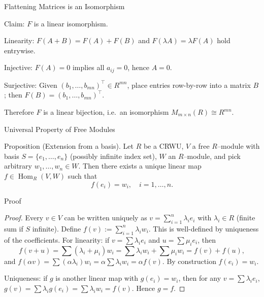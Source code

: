 \documentclass[11pt,aspectratio=43,ignorenonframetext,t]{beamer}
\begin{document}
\begin{frame}{Flattening Matrices is an Isomorphism}
\vspace{-0.3cm}
\begin{block}{Claim:} $F$ is a linear isomorphism.
\end{block}
\vspace{-0.3cm}
\begin{block}{Linearity:} $F(A+B)=F(A)+F(B)$ and $F(\lambda A)=\lambda F(A)$ hold entrywise.
\end{block}
\vspace{-0.3cm}
\begin{block}{Injective:} $F(A)=0$ implies all $a_{ij}=0$, hence $A=0$.
\end{block}
\begin{block}{Surjective:} Given $(b_1,\dots,b_{mn})^\top\in R^{mn}$, place entries row-by-row into a matrix $B$; then $F(B)=(b_1,\dots,b_{mn})^\top$.

Therefore $F$ is a linear bijection, i.e.\ an isomorphism $M_{m\times n}(R)\cong R^{mn}$.
\end{block}

\end{frame}

\begin{frame}{Universal Property of Free Modules}
\begin{block}{Proposition (Extension from a basis).}
Let $R$ be a CRWU, $V$ a free $R$–module with basis $S=\{e_1,\dots,e_n\}$ (possibly infinite index set), $W$ an $R$–module, and pick arbitrary $w_1,\dots,w_n\in W$. Then there exists a unique linear map $f\in\operatorname{Hom}_R(V,W)$ such that
\[
f(e_i)=w_i,\quad i=1,\dots,n.
\]
    
\end{block}
\end{frame}

\begin{frame}{Proof}

\begin{proof}
Every $v\in V$ can be written uniquely as $v=\sum_{i=1}^n \lambda_i e_i$ with $\lambda_i\in R$ (finite sum if $S$ infinite).
Define $f(v):=\sum_{i=1}^n \lambda_i w_i$. This is well-defined by uniqueness of the coefficients.
For linearity: if $v=\sum\lambda_i e_i$ and $u=\sum\mu_i e_i$, then
\[
f(v+u)=\sum (\lambda_i+\mu_i)w_i = \sum \lambda_i w_i + \sum \mu_i w_i = f(v)+f(u),
\]
and $f(\alpha v)=\sum (\alpha\lambda_i) w_i=\alpha \sum \lambda_i w_i=\alpha f(v)$. By construction $f(e_i)=w_i$.

Uniqueness: if $g$ is another linear map with $g(e_i)=w_i$, then for any $v=\sum \lambda_i e_i$,
$g(v)=\sum \lambda_i g(e_i)=\sum \lambda_i w_i=f(v)$. Hence $g=f$.
\end{proof}

    
\end{frame}
\end{document}
